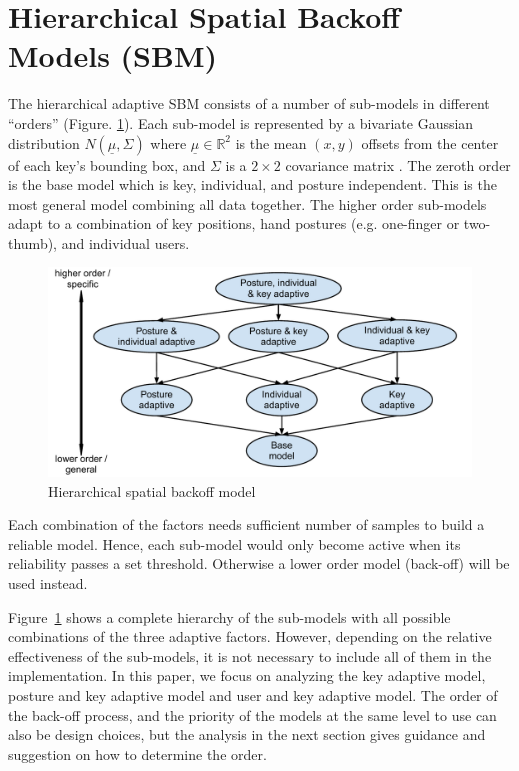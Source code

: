 \documentclass{sigchi}
\begin{document}
\section{Hierarchical Spatial Backoff Models (SBM)}
The hierarchical adaptive SBM consists of a number of sub-models in different “orders” (Figure. \ref{fig:hierarchy}). Each sub-model is represented by a bivariate Gaussian distribution $N(\underline\mu, \Sigma)$
where $\underline\mu \in \mathbb{R}^2$ is the mean $(x, y)$ offsets from the center of
each key's bounding box, and $\Sigma$ is a $2\times 2$ covariance matrix  
\cite{Azenkot:2012, Goodman:2002, Rashid:2008}.
The zeroth order is the base model which is key, individual, and posture
independent. This is the most general model combining all data together. The
higher order sub-models adapt to a combination of 
key positions, hand postures (e.g. one-finger or two-thumb), and individual users. 

\begin{figure}[tb]
  \centering
  \includegraphics[width=0.9\columnwidth]{figures/hierarchy.pdf}
  \caption{Hierarchical spatial backoff model}
  \label{fig:hierarchy}
\end{figure}

Each combination of the factors needs sufficient number of samples to build a reliable model. Hence, each sub-model would only become active when its reliability passes a set 
threshold. Otherwise a lower order model (back-off) will be used instead.

Figure~\ref{fig:hierarchy} shows a complete hierarchy of the sub-models with all
possible combinations of the three adaptive factors. However, depending on the
relative effectiveness of the sub-models, it is not necessary to include all of
them in the implementation. In this paper, we focus on analyzing the key
adaptive model, posture and key adaptive model and user and key adaptive model.
The order of the
back-off process, and the priority of the models at the same level to use can
also be design choices, but the analysis in the next section gives
guidance and suggestion on how to determine the order.
\end{document}
